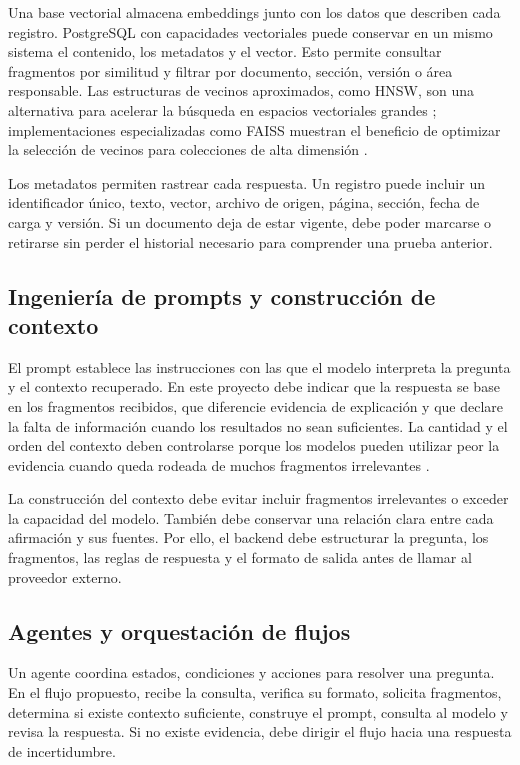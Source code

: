 Una base vectorial almacena embeddings junto con los datos que describen cada registro. PostgreSQL con capacidades vectoriales puede conservar en un mismo sistema el contenido, los metadatos y el vector. Esto permite consultar fragmentos por similitud y filtrar por documento, sección, versión o área responsable. Las estructuras de vecinos aproximados, como HNSW, son una alternativa para acelerar la búsqueda en espacios vectoriales grandes \cite{malkov2018hnsw}; implementaciones especializadas como FAISS muestran el beneficio de optimizar la selección de vecinos para colecciones de alta dimensión \cite{johnson2017faiss}.

Los metadatos permiten rastrear cada respuesta. Un registro puede incluir un identificador único, texto, vector, archivo de origen, página, sección, fecha de carga y versión. Si un documento deja de estar vigente, debe poder marcarse o retirarse sin perder el historial necesario para comprender una prueba anterior.

\subsection{Ingeniería de prompts y construcción de contexto}

El prompt establece las instrucciones con las que el modelo interpreta la pregunta y el contexto recuperado. En este proyecto debe indicar que la respuesta se base en los fragmentos recibidos, que diferencie evidencia de explicación y que declare la falta de información cuando los resultados no sean suficientes. La cantidad y el orden del contexto deben controlarse porque los modelos pueden utilizar peor la evidencia cuando queda rodeada de muchos fragmentos irrelevantes \cite{liu2024lostmiddle}.

La construcción del contexto debe evitar incluir fragmentos irrelevantes o exceder la capacidad del modelo. También debe conservar una relación clara entre cada afirmación y sus fuentes. Por ello, el backend debe estructurar la pregunta, los fragmentos, las reglas de respuesta y el formato de salida antes de llamar al proveedor externo.

\subsection{Agentes y orquestación de flujos}

Un agente coordina estados, condiciones y acciones para resolver una pregunta. En el flujo propuesto, recibe la consulta, verifica su formato, solicita fragmentos, determina si existe contexto suficiente, construye el prompt, consulta al modelo y revisa la respuesta. Si no existe evidencia, debe dirigir el flujo hacia una respuesta de incertidumbre.

